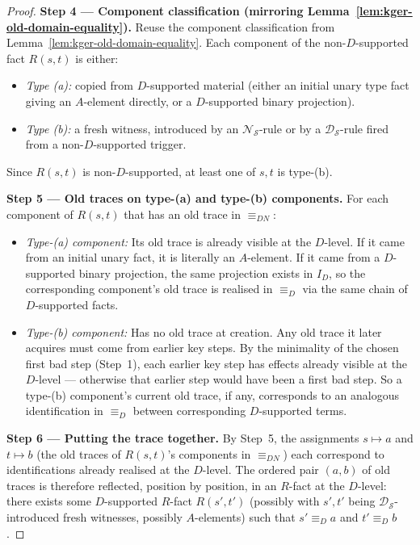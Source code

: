 \documentclass[10pt]{article}
\begin{document}
\begin{proof}
\smallskip\noindent\textbf{Step 4 --- Component classification
(mirroring Lemma~\ref{lem:kger-old-domain-equality}).}
Reuse the component classification from
Lemma~\ref{lem:kger-old-domain-equality}.  Each component of the
non-\(D\)-supported fact \(R(s,t)\) is either:
\begin{itemize}
\item \emph{Type (a):} copied from \(D\)-supported material (either an
initial unary type fact giving an \(A\)-element directly, or a
\(D\)-supported binary projection).
\item \emph{Type (b):} a fresh witness, introduced by an
\(\mathcal N_{\mathcal S}\)-rule or by a \(\mathcal D_{\mathcal S}\)-rule
fired from a non-\(D\)-supported trigger.
\end{itemize}
Since \(R(s,t)\) is non-\(D\)-supported, at least one of \(s,t\) is
type-(b).

\smallskip\noindent\textbf{Step 5 --- Old traces on type-(a) and
type-(b) components.}
For each component of \(R(s,t)\) that has an old trace in
\(\equiv_{DN}\):
\begin{itemize}
\item \emph{Type-(a) component:} Its old trace is already visible at
the \(D\)-level.  If it came from an initial unary fact, it is
literally an \(A\)-element.  If it came from a \(D\)-supported binary
projection, the same projection exists in \(I_D\), so the corresponding
component's old trace is realised in \(\equiv_D\) via the same chain
of \(D\)-supported facts.
\item \emph{Type-(b) component:} Has no old trace at creation.  Any
old trace it later acquires must come from earlier key steps.  By the
minimality of the chosen first bad step (Step~1), each earlier key
step has effects already visible at the \(D\)-level --- otherwise that
earlier step would have been a first bad step.  So a type-(b)
component's current old trace, if any, corresponds to an analogous
identification in \(\equiv_D\) between corresponding \(D\)-supported
terms.
\end{itemize}

\smallskip\noindent\textbf{Step 6 --- Putting the trace together.}
By Step~5, the assignments \(s\mapsto a\) and \(t\mapsto b\) (the old
traces of \(R(s,t)\)'s components in \(\equiv_{DN}\)) each correspond
to identifications already realised at the \(D\)-level.  The ordered
pair \((a,b)\) of old traces is therefore reflected, position by
position, in an \(R\)-fact at the \(D\)-level: there exists some
\(D\)-supported \(R\)-fact \(R(s',t')\) (possibly with \(s',t'\) being
\(\mathcal D_{\mathcal S}\)-introduced fresh witnesses, possibly
\(A\)-elements) such that \(s'\equiv_D a\) and \(t'\equiv_D b\).


\end{proof}
\end{document}
